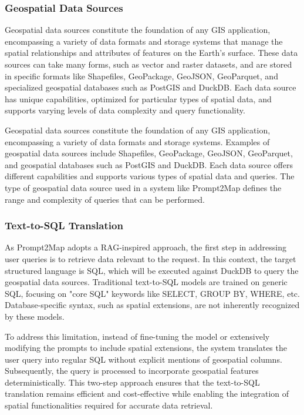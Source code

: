 \subsubsection{Geospatial Data Sources}

Geospatial data sources constitute the foundation of any GIS application, encompassing a variety of data formats and storage systems that manage the spatial relationships and attributes of features on the Earth's surface. These data sources can take many forms, such as vector and raster datasets, and are stored in specific formats like Shapefiles, GeoPackage, GeoJSON, GeoParquet, and specialized geospatial databases such as PostGIS and DuckDB. Each data source has unique capabilities, optimized for particular types of spatial data, and supports varying levels of data complexity and query functionality.

Geospatial data sources constitute the foundation of any GIS application, encompassing a variety of data formats and storage systems. Examples of geospatial data sources include Shapefiles, GeoPackage, GeoJSON, GeoParquet, and geospatial databases such as PostGIS and DuckDB. Each data source offers different capabilities and supports various types of spatial data and queries. The type of geospatial data source used in a system like Prompt2Map defines the range and complexity of queries that can be performed.

\subsubsection{Text-to-SQL Translation}

As Prompt2Map adopts a RAG-inspired approach, the first step in addressing user queries is to retrieve data relevant to the request. In this context, the target structured language is SQL, which will be executed against DuckDB to query the geospatial data sources. Traditional text-to-SQL models are trained on generic SQL, focusing on "core SQL" keywords like SELECT, GROUP BY, WHERE, etc. Database-specific syntax, such as spatial extensions, are not inherently recognized by these models.

To address this limitation, instead of fine-tuning the model or extensively modifying the prompts to include spatial extensions, the system translates the user query into regular SQL without explicit mentions of geospatial columns. Subsequently, the query is processed to incorporate geospatial features deterministically. This two-step approach ensures that the text-to-SQL translation remains efficient and cost-effective while enabling the integration of spatial functionalities required for accurate data retrieval.

